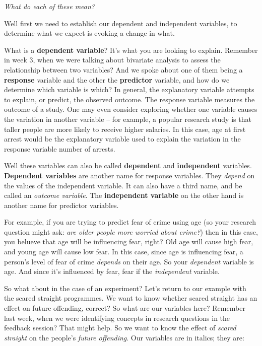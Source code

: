 \documentclass[]{book}
\theoremstyle{definition}
\theoremstyle{definition}
\theoremstyle{definition}
\theoremstyle{remark}
\begin{document}
\emph{What do each of these mean?}

Well first we need to establish our dependent and independent variables,
to determine what we expect is evoking a change in what.

What is a \textbf{dependent variable}? It's what you are looking to
explain. Remember in week 3, when we were talking about bivariate
analysis to assess the relationship between two variables? And we spoke
about one of them being a \textbf{response} variable and the other the
\textbf{predictor} variable, and how do we determine which variable is
which? In general, the explanatory variable attempts to explain, or
predict, the observed outcome. The response variable measures the
outcome of a study. One may even consider exploring whether one variable
causes the variation in another variable -- for example, a popular
research study is that taller people are more likely to receive higher
salaries. In this case, age at first arrest would be the explanatory
variable used to explain the variation in the response variable number
of arrests.

Well these variables can also be called \textbf{dependent} and
\textbf{independent} variables. \textbf{Dependent variables} are another
name for response variables. They \emph{depend} on the values of the
independent variable. It can also have a third name, and be called an
\emph{outcome variable}. The \textbf{independent variable} on the other
hand is another name for predictor variables.

For example, if you are trying to predict fear of crime using age (so
your research question might ask: \emph{are older people more worried
about crime?}) then in this case, you belueve that age will be
influencing fear, right? Old age will cause high fear, and young age
will cause low fear. In this case, since age is influencing fear, a
person's level of fear of crime \emph{depends} on their age. So your
\emph{dependent} variable is age. And since it's influenced by fear,
fear if the \emph{independent} variable.

So what about in the case of an experiment? Let's return to our example
with the scared straight programmes. We want to know whether scared
straight has an effect on future offending, correct? So what are our
variables here? Remember last week, when we were identifying concepts in
research questions in the feedback session? That might help. So we want
to know the effect of \emph{scared straight} on the people's
\emph{future offending}. Our variables are in italics; they are:
\end{document}
